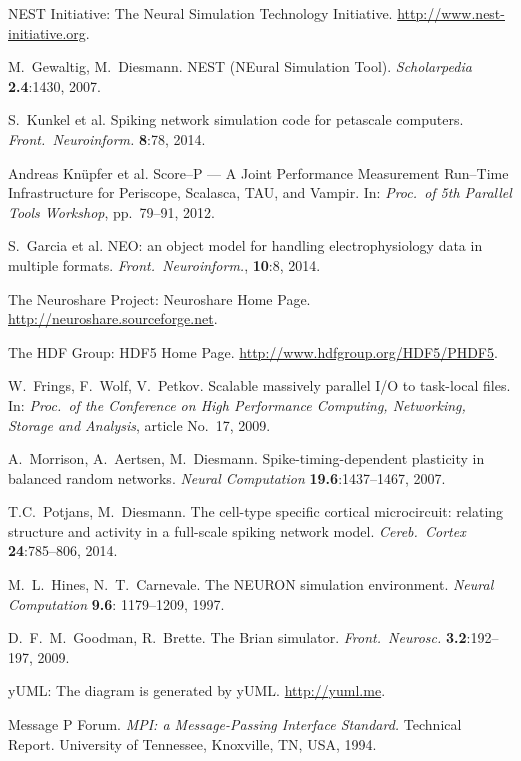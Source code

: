 \documentclass[]{YIC2015}
\begin{document}
\begin{thebibliography}{99}

 NEST Initiative: The Neural Simulation
  Technology Initiative. \url{http://www.nest-initiative.org}.

  M.~Gewaltig, M.~Diesmann. NEST (NEural Simulation
  Tool). \textit{Scholarpedia} %
  \textbf{2.4}:1430, 2007.

 S.~Kunkel et al. Spiking network simulation code for
  petascale computers.  \textit{Front.~Neuroinform.} \textbf{8}:78,
  2014.

 Andreas Kn\"upfer et al. Score--P --- A Joint
  Performance Measurement Run--Time Infrastructure for Periscope,
  Scalasca, TAU, and Vampir. In: \textit{Proc.~of 5th Parallel Tools
    Workshop}, pp.~79--91, 2012.

 S.~Garcia et al. NEO: an object model for handling
  electrophysiology data in multiple formats.
  \textit{Front.~Neuroinform.}, \textbf{10}:8, 2014.

 The Neuroshare Project: Neuroshare Home
  Page. \url{http://neuroshare.sourceforge.net}.

 The HDF Group: HDF5 Home
  Page. \url{http://www.hdfgroup.org/HDF5/PHDF5}.

 W.~Frings, F.~Wolf, V.~Petkov. Scalable
  massively parallel I/O to task-local files.  In: \textit{Proc.~of
  the Conference on High Performance Computing, Networking,
    Storage and Analysis}, article No.~17, 2009.

 A.~Morrison, A.~Aertsen,
  M.~Diesmann. Spike-timing-dependent plasticity in balanced random
  networks. \textit{Neural Computation} \textbf{19.6}:1437--1467,
  2007.

 T.C.~Potjans, M.~Diesmann. The cell-type specific
  cortical microcircuit: relating structure and activity in a
  full-scale spiking network model. \textit{Cereb.~Cortex}
  \textbf{24}:785--806, 2014.

 M.~L.~Hines, N.~T.~Carnevale. The NEURON simulation
  environment. \textit{Neural Computation} \textbf{9.6}: 1179--1209,
  1997.

 D.~F.~M.~Goodman, R.~Brette. The Brian
  simulator. \textit{Front.~Neurosc.} \textbf{3.2}:192--197, 2009.
  
 yUML: The diagram is generated by yUML. \url{http://yuml.me}.

 Message P Forum. \textit{MPI: a Message-Passing Interface
  Standard.} Technical Report. University of Tennessee, Knoxville, TN,
  USA, 1994.

\end{thebibliography}
\end{document}
